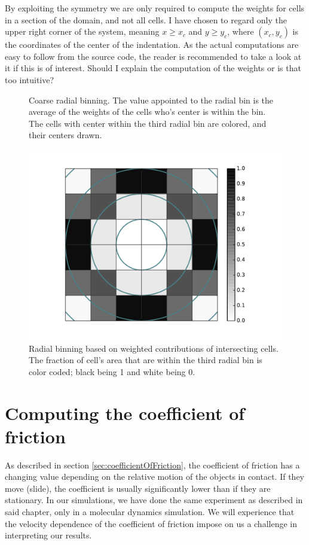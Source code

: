 \documentclass[twoside,english]{uiofysmaster}
\begin{document}
By exploiting the symmetry we are only required to compute the weights for cells in a section of the domain, and not all cells. 
I have chosen to regard only the upper right corner of the system, meaning $x\geq x_c$ and $y\geq y_c$, where $(x_c, y_c)$ is the coordinates of the center of the indentation.
As the actual computations are easy to follow from the source code, the reader is recommended to take a look at it if this is of interest. 
{\Large Should I explain the computation of the weights or is that too intuitive?}


\begin{figure}[H]
	\center
	\resizebox{0.48\linewidth}{!}{
		
	}
	\caption{Coarse radial binning. The value appointed to the radial bin is the average of the weights of the cells who's center is within the bin. The cells with center within the third radial bin are colored, and their centers drawn.}
	\label{fig:radialBinningChoars}
\end{figure}


\begin{figure}[H]
	\centering
	\hspace{0.87cm}
	\includegraphics[height=0.482\linewidth]{figures/forceDistribution/radialDistribution/weights.pdf}
	\caption{Radial binning based on weighted contributions of intersecting cells. The fraction of cell's area that are within the third radial bin is color coded; black being 1 and white being 0.}
	\label{fig:radialBinningWeights}
\end{figure}





\chapter{Computing the coefficient of friction}
As described in section \ref{sec:coefficientOfFriction}, the coefficient of friction has a changing value depending on the relative motion of the objects in contact. 
If they move (slide), the coefficient is usually significantly lower than if they are stationary. 
In our simulations, we have done the same experiment as described in said chapter, only in a molecular dynamics simulation. 
We will experience that the velocity dependence of the coefficient of friction impose on us a challenge in interpreting our results.
\end{document}
